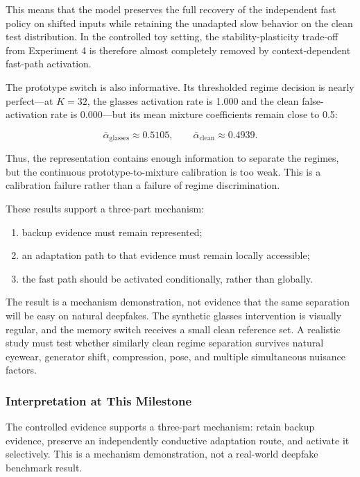 \documentclass[
  10pt,
]{article}
\providecommand{\tightlist}{%
  \setlength{\itemsep}{0pt}\setlength{\parskip}{0pt}}
\begin{document}
This means that the model preserves the full recovery of the independent
fast policy on shifted inputs while retaining the unadapted slow
behavior on the clean test distribution. In the controlled toy setting,
the stability-plasticity trade-off from Experiment 4 is therefore almost
completely removed by context-dependent fast-path activation.

The prototype switch is also informative. Its thresholded regime
decision is nearly perfect---at \(K=32\), the glasses activation rate is
1.000 and the clean false-activation rate is 0.000---but its mean
mixture coefficients remain close to 0.5:

\[
\bar{\alpha}_{\mathrm{glasses}}\approx0.5105,
\qquad
\bar{\alpha}_{\mathrm{clean}}\approx0.4939.
\]

Thus, the representation contains enough information to separate the
regimes, but the continuous prototype-to-mixture calibration is too
weak. This is a calibration failure rather than a failure of regime
discrimination.

These results support a three-part mechanism:

\begin{enumerate}
\def\labelenumi{\arabic{enumi}.}
\tightlist
\item
  backup evidence must remain represented;
\item
  an adaptation path to that evidence must remain locally accessible;
\item
  the fast path should be activated conditionally, rather than globally.
\end{enumerate}

The result is a mechanism demonstration, not evidence that the same
separation will be easy on natural deepfakes. The synthetic glasses
intervention is visually regular, and the memory switch receives a small
clean reference set. A realistic study must test whether similarly clean
regime separation survives natural eyewear, generator shift,
compression, pose, and multiple simultaneous nuisance factors.

\hypertarget{interpretation-at-this-milestone}{%
\subsubsection{Interpretation at This
Milestone}\label{interpretation-at-this-milestone}}

The controlled evidence supports a three-part mechanism: retain backup
evidence, preserve an independently conductive adaptation route, and
activate it selectively. This is a mechanism demonstration, not a
real-world deepfake benchmark result.
\end{document}
